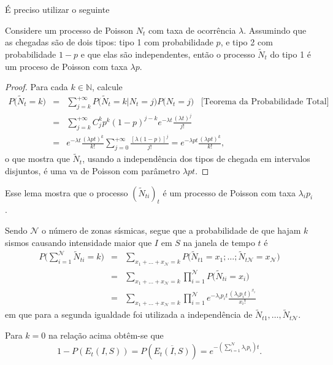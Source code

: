 É preciso utilizar o seguinte
\begin{lemma}
Considere um processo de Poisson $N_t$ com taxa de ocorrência $\lambda$.
Assumindo que as chegadas são de dois tipos: tipo 1 com probabilidade $p$,
e tipo 2 com probabilidade  $1 - p$ e que elas são independentes, 
então o processo $\tilde N_t$ do tipo 1 é um proceso de Poisson com taxa
$\lambda p$.
\end{lemma}
\begin{proof} Para cada $k \in \mathbb{N}$, calcule
$$
\begin{array}{lll}
P\Big(\tilde N_{t} =k \Big) & = & \displaystyle \sum_{j=k}^{+\infty} P\Big(\tilde N_{t} =k | N_{t}
=j\Big)  P \Big( N_{t} =j  \Big)\;\;\;\mbox{[Teorema da Probabilidade Total]}\\
&=& \displaystyle \sum_{j=k}^{+\infty} C_j^k p^k (1-p)^{j-k} e^{-\lambda t} \frac{(\lambda t)^j}{j!} \\
&=&e^{-\lambda t} \frac{(\lambda p t)^k}{k!} \displaystyle \sum_{j=0}^{+\infty} \frac{[\lambda (1-p)]^{j}}{j!} = e^{-\lambda p t} \frac{(\lambda p t)^k}{k!},
\end{array}
$$
o que mostra que $\tilde N_{t}$, usando a independência dos tipos de chegada em
intervalos disjuntos, é uma \gls{va} de Poisson com parâmetro
$\lambda p t$.\hfill
\end{proof}

Esse lema mostra que o processo $(\tilde N_{t i})_t$ é um processo de Poisson com taxa $\lambda_i p_i$.

Sendo $\mathcal{N}$ o número de zonas sísmicas, segue que a probabilidade de que hajam $k$ sismos causando
intensidade maior que $I$ em $S$ na janela de tempo $t$ é
$$
\displaystyle
\begin{array}{lll}
P\Big(\displaystyle \sum_{i=1}^{\mathcal{N}} \tilde N_{t i} = k\Big)
&= &\displaystyle \sum_{x_1+\ldots +x_{\mathcal{N}}=k} P\Big(\tilde N_{t 1} = x_1; \ldots; \tilde N_{t \mathcal{N}} = x_{\mathcal{N}} \Big)\\
&= &\displaystyle{\sum_{x_1+\ldots +x_{\mathcal{N}}=k} \prod_{i=1}^{\mathcal{N}}}P\Big(\tilde N_{t i} = x_i \Big)\\
&= &\displaystyle \sum_{x_1+\ldots +x_{\mathcal{N}}=k} \prod_{i=1}^{\mathcal{N}} e^{-\lambda_i p_i t} \frac{(\lambda_i p_i t)^{x_i}}{x_{i}!}
\end{array}
$$
em que para a segunda igualdade foi utilizada a independência de  ${\tilde N}_{t 1}, \ldots, {\tilde N}_{t
\mathcal{N}}$.


Para $k=0$ na relação acima obtêm-se que
\begin{equation} \label{probinterest}
1-P( E_t(I, S) )= P(\overline{E_t(I, S)})=e^{-(\sum_{i=1}^{\mathcal{N}} \lambda_i p_i) t}.
\end{equation}

